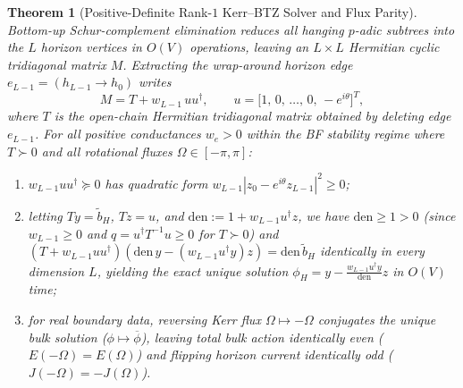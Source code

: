 \documentclass[11pt,a4paper]{article}
\numberwithin{equation}{section}
\theoremstyle{plain}
\newtheorem{theorem}{Theorem}[section]
\theoremstyle{definition}
\theoremstyle{remark}
\begin{document}
\begin{theorem}[Positive-Definite Rank-$1$ Kerr--BTZ Solver and Flux Parity]
\label{thm:solver}
Bottom-up Schur-complement elimination reduces all hanging $p$-adic subtrees into the $L$ horizon vertices in $O(V)$ operations, leaving an $L \times L$ Hermitian cyclic tridiagonal matrix $M$. Extracting the wrap-around horizon edge $e_{L-1} = (h_{L-1} \to h_0)$ writes
\begin{equation}
  M = T + w_{L-1}\, u u^\dagger, \qquad
  u = \bigl[1,\, 0,\, \dots,\, 0,\, -e^{i\theta}\bigr]^T,
  \label{eq:sm-decomp}
\end{equation}
where $T$ is the open-chain Hermitian tridiagonal matrix obtained by deleting edge $e_{L-1}$. For all positive conductances $w_e > 0$ within the BF stability regime where $T \succ 0$ and all rotational fluxes $\Omega \in [-\pi,\pi]$:
\begin{enumerate}[leftmargin=1.8em,itemsep=2pt]
  \item $w_{L-1} u u^\dagger \succeq 0$ has quadratic form $w_{L-1}|z_0 - e^{i\theta} z_{L-1}|^2 \ge 0$;
  \item letting $Ty = \tilde{b}_H$, $Tz = u$, and $\mathrm{den} := 1 + w_{L-1} u^\dagger z$, we have $\mathrm{den} \ge 1 > 0$ (since $w_{L-1} \ge 0$ and $q = u^\dagger T^{-1} u \ge 0$ for $T \succ 0$) and $(T + w_{L-1} u u^\dagger)(\mathrm{den}\,y - (w_{L-1} u^\dagger y)z) = \mathrm{den}\,\tilde{b}_H$ identically in every dimension $L$, yielding the exact unique solution $\phi_H = y - \frac{w_{L-1} u^\dagger y}{\mathrm{den}} z$ in $O(V)$ time;
  \item for real boundary data, reversing Kerr flux $\Omega \mapsto -\Omega$ conjugates the unique bulk solution ($\phi \mapsto \overline{\phi}$), leaving total bulk action identically even ($E(-\Omega) = E(\Omega)$) and flipping horizon current identically odd ($J(-\Omega) = -J(\Omega)$).
\end{enumerate}
\end{theorem}
\end{document}
